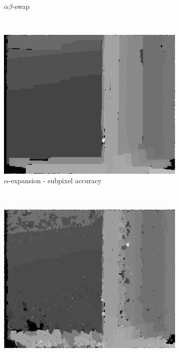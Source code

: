 \documentclass[letterpaper, 10 pt, conference]{ieeeconf}  %
\begin{document}
\begin{figure}[t]
\begin{subfigure}[b]{0.3\textwidth}
                \caption{$\alpha\beta$-swap}
                \label{fig:farm}
        \end{subfigure}
                        ~ %
        \begin{subfigure}[b]{0.3\textwidth}
                \centering
                \includegraphics[width=\textwidth]{imgs/l2disparity-expansion-sub.png}
                \caption{$\alpha$-expansion - subpixel accuracy}
                \label{fig:farm}
        \end{subfigure}
                ~ %
        \begin{subfigure}[b]{0.3\textwidth}
                \centering
                \includegraphics[width=\textwidth]{imgs/l2disparity-swap-sub.png}

\end{subfigure}
\end{figure}
\end{document}
